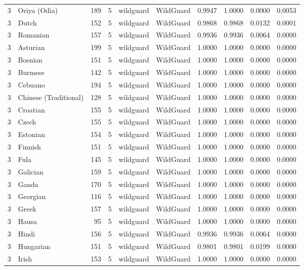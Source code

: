 \begin{tabular}{rlrrllrrrr}
3 & Oriya (Odia) & 189 & 5 & wildguard & WildGuard & 0.9947 & 1.0000 & 0.0000 & 0.0053 \\
3 & Dutch & 152 & 5 & wildguard & WildGuard & 0.9868 & 0.9868 & 0.0132 & 0.0001 \\
3 & Romanian & 157 & 5 & wildguard & WildGuard & 0.9936 & 0.9936 & 0.0064 & 0.0000 \\
3 & Asturian & 199 & 5 & wildguard & WildGuard & 1.0000 & 1.0000 & 0.0000 & 0.0000 \\
3 & Bosnian & 151 & 5 & wildguard & WildGuard & 1.0000 & 1.0000 & 0.0000 & 0.0000 \\
3 & Burmese & 142 & 5 & wildguard & WildGuard & 1.0000 & 1.0000 & 0.0000 & 0.0000 \\
3 & Cebuano & 194 & 5 & wildguard & WildGuard & 1.0000 & 1.0000 & 0.0000 & 0.0000 \\
3 & Chinese (Traditional) & 128 & 5 & wildguard & WildGuard & 1.0000 & 1.0000 & 0.0000 & 0.0000 \\
3 & Croatian & 155 & 5 & wildguard & WildGuard & 1.0000 & 1.0000 & 0.0000 & 0.0000 \\
3 & Czech & 155 & 5 & wildguard & WildGuard & 1.0000 & 1.0000 & 0.0000 & 0.0000 \\
3 & Estonian & 154 & 5 & wildguard & WildGuard & 1.0000 & 1.0000 & 0.0000 & 0.0000 \\
3 & Finnish & 151 & 5 & wildguard & WildGuard & 1.0000 & 1.0000 & 0.0000 & 0.0000 \\
3 & Fula & 145 & 5 & wildguard & WildGuard & 1.0000 & 1.0000 & 0.0000 & 0.0000 \\
3 & Galician & 159 & 5 & wildguard & WildGuard & 1.0000 & 1.0000 & 0.0000 & 0.0000 \\
3 & Ganda & 170 & 5 & wildguard & WildGuard & 1.0000 & 1.0000 & 0.0000 & 0.0000 \\
3 & Georgian & 116 & 5 & wildguard & WildGuard & 1.0000 & 1.0000 & 0.0000 & 0.0000 \\
3 & Greek & 157 & 5 & wildguard & WildGuard & 1.0000 & 1.0000 & 0.0000 & 0.0000 \\
3 & Hausa & 95 & 5 & wildguard & WildGuard & 1.0000 & 1.0000 & 0.0000 & 0.0000 \\
3 & Hindi & 156 & 5 & wildguard & WildGuard & 0.9936 & 0.9936 & 0.0064 & 0.0000 \\
3 & Hungarian & 151 & 5 & wildguard & WildGuard & 0.9801 & 0.9801 & 0.0199 & 0.0000 \\
3 & Irish & 153 & 5 & wildguard & WildGuard & 1.0000 & 1.0000 & 0.0000 & 0.0000 \\

\end{tabular}
